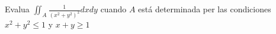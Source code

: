 Evalua $\iint_A \frac{1}{\left(x^2+y^2\right)^2} d x d y$ cuando $A$ está determinada per las condiciones $x^2+y^2 \leq 1$ y $x+y \geq 1$
